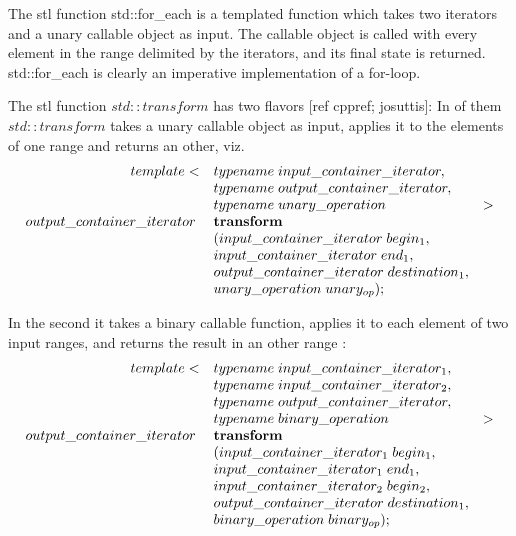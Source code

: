 \documentclass[12pt,fleqn]{article}
\begin{document}
The stl function std::for\_each is a templated function which takes two iterators and a unary callable object as input.
The callable object is called with every element in the range delimited by the iterators, and its final state is returned.
std::for\_each is clearly an imperative implementation of a for-loop.

The stl function $std::transform$ has two flavors [ref cppref; josuttis]:
In of them $std::transform$ takes a unary callable object as input, applies it to the elements of one range and returns an other, viz.
\[
\begin{array}{rll}
template<&typename\; input\_container\_iterator, \\
               &typename \; output \_container\_iterator, \\
             &typename \; unary\_operation &>\\
output\_container\_iterator\;& \mbox{\bf transform}\\
&( input\_container\_iterator\; begin_1, \\
& input\_container\_iterator \; end_1, \\
& output\_container\_iterator \; destination_1, \\
& unary\_operation \; unary_{op} );
\end{array}
\]

In the second it takes a binary callable function, applies it to each element of two input ranges, and returns the result in an other range :
\[
\begin{array}{rll}
template<&typename\; input\_container\_iterator_1, \\
                &typename\; input\_container\_iterator_2, \\
               &typename \; output \_container\_iterator, \\
             &typename \; binary\_operation &>\\
output\_container\_iterator\;& \mbox{\bf transform}\\
&( input\_container\_iterator_1\; begin_1, \\
& input\_container\_iterator_1 \; end_1, \\
&input\_container\_iterator_2\; begin_2, \\
& output\_container\_iterator \; destination_1, \\
& binary\_operation \; binary_{op} );
\end{array}
\]
\end{document}
